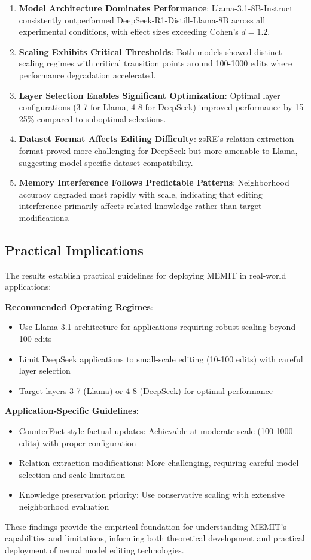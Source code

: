 \begin{enumerate}
    \item \textbf{Model Architecture Dominates Performance}: Llama-3.1-8B-Instruct consistently outperformed DeepSeek-R1-Distill-Llama-8B across all experimental conditions, with effect sizes exceeding Cohen's $d = 1.2$.

    \item \textbf{Scaling Exhibits Critical Thresholds}: Both models showed distinct scaling regimes with critical transition points around 100-1000 edits where performance degradation accelerated.

    \item \textbf{Layer Selection Enables Significant Optimization}: Optimal layer configurations (3-7 for Llama, 4-8 for DeepSeek) improved performance by 15-25\% compared to suboptimal selections.

    \item \textbf{Dataset Format Affects Editing Difficulty}: zsRE's relation extraction format proved more challenging for DeepSeek but more amenable to Llama, suggesting model-specific dataset compatibility.

    \item \textbf{Memory Interference Follows Predictable Patterns}: Neighborhood accuracy degraded most rapidly with scale, indicating that editing interference primarily affects related knowledge rather than target modifications.
\end{enumerate}

\subsection{Practical Implications}
\label{subsec:practical_implications}

The results establish practical guidelines for deploying MEMIT in real-world applications:

\textbf{Recommended Operating Regimes}:
\begin{itemize}
    \item Use Llama-3.1 architecture for applications requiring robust scaling beyond 100 edits
    \item Limit DeepSeek applications to small-scale editing (10-100 edits) with careful layer selection
    \item Target layers 3-7 (Llama) or 4-8 (DeepSeek) for optimal performance
\end{itemize}

\textbf{Application-Specific Guidelines}:
\begin{itemize}
    \item CounterFact-style factual updates: Achievable at moderate scale (100-1000 edits) with proper configuration
    \item Relation extraction modifications: More challenging, requiring careful model selection and scale limitation
    \item Knowledge preservation priority: Use conservative scaling with extensive neighborhood evaluation
\end{itemize}

These findings provide the empirical foundation for understanding MEMIT's capabilities and limitations, informing both theoretical development and practical deployment of neural model editing technologies.
